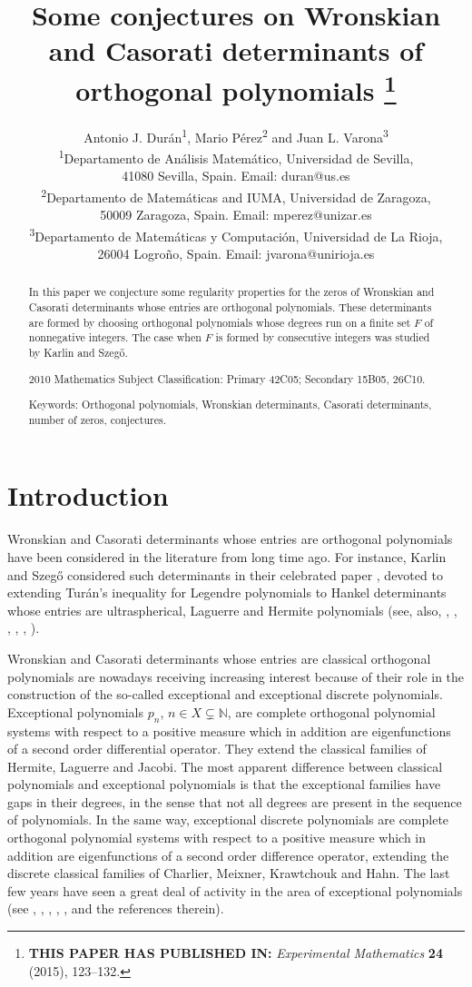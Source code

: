 \documentclass[10pt]{article}
\title{Some conjectures on Wronskian and Casorati determinants of orthogonal polynomials%
\footnote{\textbf{THIS PAPER HAS PUBLISHED IN:}
\textit{Experimental Mathematics} \textbf{24} (2015), 123--132.}}
\author{Antonio J. Dur\'an\textsuperscript{1}, Mario P\'erez\textsuperscript{2} and Juan L. Varona\textsuperscript{3}\\[6pt]
\small\textsuperscript{1}Departamento de An\'alisis Matem\'atico,
Universidad de Sevilla,\\[-2pt]
\small 41080 Sevilla, Spain. Email: {duran@us.es}\\[6pt]
\small\textsuperscript{2}Departamento de Matem\'aticas and IUMA,
Universidad de Zaragoza,\\[-2pt]
\small 50009 Zaragoza, Spain. Email: {mperez@unizar.es}\\[6pt]
\small\textsuperscript{3}Departamento de Matem\'aticas y
Computaci\'on, Universidad de La Rioja,\\[-2pt]
\small 26004 Logro\~no, Spain. Email: {jvarona@unirioja.es}}
\date{}
\theoremstyle{plain}
\theoremstyle{definition}
\numberwithin{equation}{section} %
\newcommand\NN{\mathbb{N}}
\begin{document}

\sloppy

\maketitle

\begin{abstract}
In this paper we conjecture some regularity properties for the zeros of Wronskian and Casorati determinants whose entries are orthogonal polynomials.
These determinants are formed by choosing orthogonal polynomials whose degrees run on a finite set $F$ of nonnegative integers.
The case when $F$ is formed by consecutive integers was studied by Karlin and Szeg\H{o}.

2010 Mathematics Subject Classification: Primary 42C05; Secondary 15B05, 26C10.

Keywords: Orthogonal polynomials, Wronskian determinants, Casorati determinants, number of zeros, conjectures.
\end{abstract}

\section{Introduction}

Wronskian and Casorati determinants whose entries are orthogonal polynomials have been considered in the literature from long time ago. For instance,
Karlin and Szeg\H{o} considered such determinants in their celebrated paper \cite{KS}, devoted to extending Tur\'an's inequality for Legendre polynomials \cite{Tu} to Hankel determinants whose entries are ultraspherical, Laguerre and Hermite  polynomials (see, also, \cite{KMc}, \cite{DD}, \cite{Is}, \cite{IL}, \cite{FHV}, \cite{FZ}).

Wronskian and Casorati determinants whose entries are classical orthogonal polynomials are nowadays receiving increasing interest because of their role in the construction of the so-called exceptional  and exceptional discrete polynomials. Exceptional polynomials $p_n$, $n\in X \varsubsetneq \NN$, are complete orthogonal polynomial systems with respect to a positive measure which in addition
are eigenfunctions of a second order differential operator.
They extend the  classical families of Hermite, Laguerre and Jacobi. The most apparent difference between classical polynomials and exceptional polynomials
is that the exceptional families have gaps in their degrees, in the
sense that not all degrees are present in the sequence of polynomials. In the same way, exceptional discrete  polynomials are complete orthogonal polynomial systems with respect to a positive measure which in addition are eigenfunctions of a second order difference operator, extending the discrete classical families of Charlier, Meixner, Krawtchouk and Hahn.
The last few years have seen a great deal of activity in the area of exceptional polynomials (see \cite{du1}, \cite{du2}, \cite{GUKM1}, \cite{GUGM}, \cite{STZ}, and the references therein).
\end{document}
